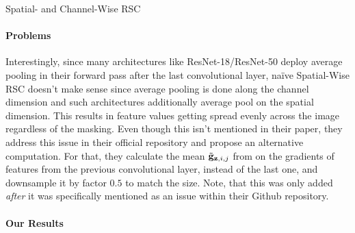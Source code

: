 \begin{algorithm}[t]
    \SetAlgoLined
    \SetNoFillComment
    \BlankLine
\caption{Spatial- and Channel-Wise RSC}
\label{alg:SpatialRSC}
\end{algorithm}


\paragraph{Problems}
Interestingly, since many architectures like ResNet-18/ResNet-50 deploy average pooling in their forward pass after the last convolutional layer, na\"ive Spatial-Wise RSC doesn't make sense since average pooling is done along the channel dimension and such architectures additionally average pool on the spatial dimension. This results in feature values getting spread evenly across the image regardless of the masking. Even though this isn't mentioned in their paper, they address this issue in their official repository and propose an alternative computation. For that, they calculate the mean $\Tilde{\mathbf{g}}_{\mathbf{z}, i, j}$ from  on the gradients of features from the previous convolutional layer, instead of the last one, and downsample it by factor $0.5$ to match the size. Note, that this was only added \emph{after} it was specifically mentioned as an issue within their Github repository. 

\paragraph{Our Results}


